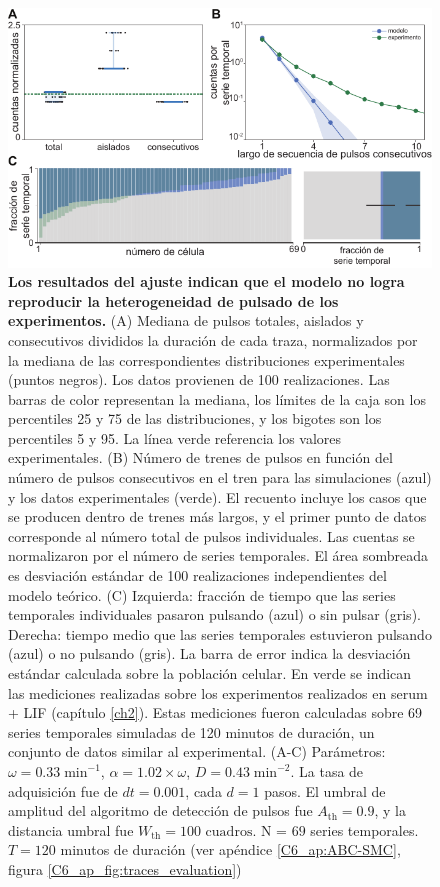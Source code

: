 \documentclass[./main.tex]{subfiles}
\begin{document}
\begin{figure}
    \centering
    \includegraphics[width=1\columnwidth]{figures/chapter6/C6_param_evaluation.pdf} 
    \caption{\textbf{Los resultados del ajuste indican que el modelo no logra reproducir la heterogeneidad de pulsado de los experimentos.} (A) Mediana de pulsos totales, aislados y consecutivos divididos la duración de cada traza, normalizados por la mediana de las correspondientes distribuciones experimentales (puntos negros). Los datos provienen de 100 realizaciones. Las barras de color representan la mediana, los límites de la caja son los percentiles 25 y 75 de las distribuciones, y los bigotes son los percentiles 5 y 95. La línea verde referencia los valores experimentales. (B) Número de trenes de pulsos en función del número de pulsos consecutivos en el tren para las simulaciones (azul) y los datos experimentales (verde). El recuento incluye los casos que se producen dentro de trenes más largos, y el primer punto de datos corresponde al número total de pulsos individuales. Las cuentas se normalizaron por el número de series temporales. El área sombreada es desviación estándar de 100 realizaciones independientes del modelo teórico. (C) Izquierda: fracción de tiempo que las series temporales individuales pasaron pulsando (azul) o sin pulsar (gris). Derecha: tiempo medio que las series temporales estuvieron pulsando (azul) o no pulsando (gris). La barra de error indica la desviación estándar calculada sobre la población celular. En verde se indican las mediciones realizadas sobre los experimentos realizados en serum + LIF (capítulo \ref{ch2}). Estas mediciones fueron calculadas sobre 69 series temporales simuladas de 120 minutos de duración, un conjunto de datos similar al experimental. (A-C) Parámetros:  $\omega = 0.33 \;\text{min}^{-1}$, $\alpha = 1.02 \times \omega$, $ D = 0.43 \; \text{min}^{-2}$. La tasa de adquisición fue de $dt = 0.001$, cada $d = 1$ pasos. El umbral de amplitud del algoritmo de detección de pulsos fue $A_{\text{th}} = 0.9$, y la distancia umbral fue $W_{\text{th}} = 100\text{ cuadros}$. N = $69$ series temporales. $T = 120$ minutos de duración (ver apéndice \ref{C6_ap:ABC-SMC}, figura \ref{C6_ap_fig:traces_evaluation})}
    \label{C6_fig:param_evaluation}
\end{figure} 
\end{document}
